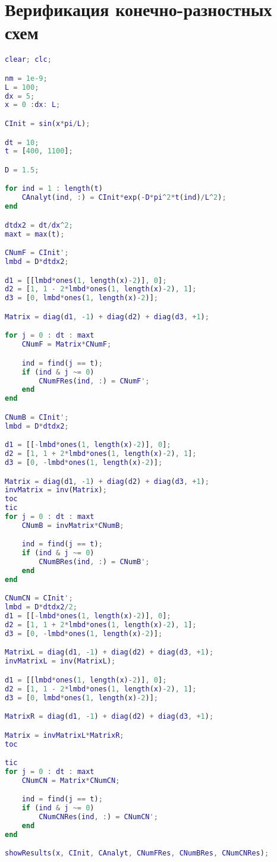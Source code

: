 \chapter{Верификация конечно-разностных схем}
\label{app:DifFD}
\begin{lstlisting}[style=realcode,language=Matlab,caption={Функция верификация конечно-разностных схем: FTCS, BTCS, Crank-Nicolson},label={lst:DifFD}]
clear; clc;

nm = 1e-9;
L = 100;
dx = 5;
x = 0 :dx: L;

CInit = sin(x*pi/L);

dt = 10;
t = [400, 1100];

D = 1.5;

for ind = 1 : length(t)
	CAnalyt(ind, :) = CInit*exp(-D*pi^2*t(ind)/L^2);
end

dtdx2 = dt/dx^2;
maxt = max(t);

CNumF = CInit';
lmbd = D*dtdx2;

d1 = [[lmbd*ones(1, length(x)-2)], 0];
d2 = [1, 1 - 2*lmbd*ones(1, length(x)-2), 1];
d3 = [0, lmbd*ones(1, length(x)-2)];

Matrix = diag(d1, -1) + diag(d2) + diag(d3, +1);

for j = 0 : dt : maxt
	CNumF = Matrix*CNumF;

	ind = find(j == t); 
	if (ind & j ~= 0)
		CNumFRes(ind, :) = CNumF';
	end
end

CNumB = CInit';
lmbd = D*dtdx2;

d1 = [[-lmbd*ones(1, length(x)-2)], 0];
d2 = [1, 1 + 2*lmbd*ones(1, length(x)-2), 1];
d3 = [0, -lmbd*ones(1, length(x)-2)];

Matrix = diag(d1, -1) + diag(d2) + diag(d3, +1);
invMatrix = inv(Matrix);
toc
tic
for j = 0 : dt : maxt
	CNumB = invMatrix*CNumB;

	ind = find(j == t); 
	if (ind & j ~= 0)
		CNumBRes(ind, :) = CNumB';
	end
end

CNumCN = CInit';
lmbd = D*dtdx2/2;
d1 = [[-lmbd*ones(1, length(x)-2)], 0];
d2 = [1, 1 + 2*lmbd*ones(1, length(x)-2), 1];
d3 = [0, -lmbd*ones(1, length(x)-2)];

MatrixL = diag(d1, -1) + diag(d2) + diag(d3, +1);
invMatrixL = inv(MatrixL);

d1 = [[lmbd*ones(1, length(x)-2)], 0];
d2 = [1, 1 - 2*lmbd*ones(1, length(x)-2), 1];
d3 = [0, lmbd*ones(1, length(x)-2)];

MatrixR = diag(d1, -1) + diag(d2) + diag(d3, +1);

Matrix = invMatrixL*MatrixR;
toc

tic
for j = 0 : dt : maxt
	CNumCN = Matrix*CNumCN;

	ind = find(j == t); 
	if (ind & j ~= 0)
		CNumCNRes(ind, :) = CNumCN';
	end
end

showResults(x, CInit, CAnalyt, CNumFRes, CNumBRes, CNumCNRes);
\end{lstlisting}